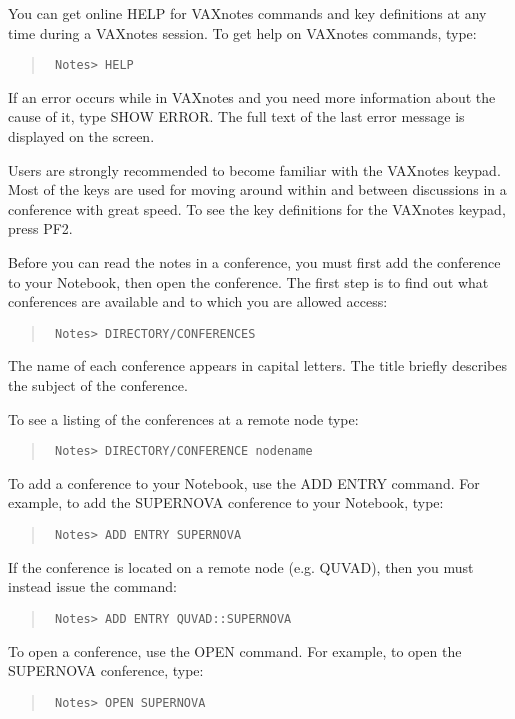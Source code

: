 You can get online HELP for VAXnotes commands and key definitions
at any time during a VAXnotes session.
To get help on VAXnotes commands, type:

\begin{quote}\tt
Notes> HELP
\end{quote}

If an error occurs while in VAXnotes and you need more information
about the cause of it, type SHOW ERROR.  The full text of the last
error message is displayed on the screen.

Users are strongly recommended to become familiar with the VAXnotes keypad.
Most of the keys are used for moving around within and between
discussions in a conference with great speed.
To see the key definitions for the VAXnotes keypad, press PF2.

Before you can read the notes in a conference, you must first add the
conference to your Notebook, then open the conference. The first step is
to find out what conferences are available and to which you are allowed access:

\begin{quote}\tt
Notes> DIRECTORY/CONFERENCES
\end{quote}

The name of each conference appears in capital letters.  The title briefly
describes the subject of the conference.

To see a listing of the conferences at a remote node type:

\begin{quote}\tt
Notes> DIRECTORY/CONFERENCE nodename
\end{quote}

To add a conference to your Notebook, use the ADD ENTRY command.  For
example, to add the SUPERNOVA conference to your Notebook, type:

\begin{quote}\tt
Notes> ADD ENTRY SUPERNOVA
\end{quote}

If the conference is located on a remote node (e.g. QUVAD), then
you must instead issue the command:

\begin{quote}\tt
Notes> ADD ENTRY QUVAD::SUPERNOVA
\end{quote}

To open a conference, use the OPEN command.  For example, to open the
SUPERNOVA conference, type:

\begin{quote}\tt
Notes> OPEN SUPERNOVA
\end{quote}

